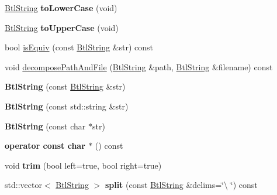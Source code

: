 \begin{DoxyCompactItemize}
\item 
\mbox{\label{class_btl_string_ada1b52b906ff481c13f55b7373386489}} 
\hyperlink{class_btl_string}{Btl\+String} {\bfseries to\+Lower\+Case} (void)
\item 
\mbox{\label{class_btl_string_a2f5dfde0fecaeaf2d2bb359c0cdb22cb}} 
\hyperlink{class_btl_string}{Btl\+String} {\bfseries to\+Upper\+Case} (void)
\item 
bool \hyperlink{class_btl_string_afdc2da5f185fa7585b1363b2dd6b36cb}{is\+Equiv} (const \hyperlink{class_btl_string}{Btl\+String} \&str) const
\item 
void \hyperlink{class_btl_string_a111377f6625fffeed8f02992fd164730}{decompose\+Path\+And\+File} (\hyperlink{class_btl_string}{Btl\+String} \&path, \hyperlink{class_btl_string}{Btl\+String} \&filename) const
\item 
\mbox{\label{class_btl_string_a21d40446a7d25f3ef740f80689f32f66}} 
{\bfseries Btl\+String} (const \hyperlink{class_btl_string}{Btl\+String} \&str)
\item 
\mbox{\label{class_btl_string_aab0e0973f37c21210515b58d1f973dbd}} 
{\bfseries Btl\+String} (const std\+::string \&str)
\item 
\mbox{\label{class_btl_string_aac66632b3613e854eb4437af8e893b41}} 
{\bfseries Btl\+String} (const char $\ast$str)
\item 
\mbox{\label{class_btl_string_ad53f1bbcd9a0af65b267869395e0ac82}} 
{\bfseries operator const char $\ast$} () const
\item 
\mbox{\label{class_btl_string_a6f98887f0f3fae14f3294eb393cf8bbe}} 
void {\bfseries trim} (bool left=true, bool right=true)
\item 
\mbox{\label{class_btl_string_a2d6f3640cbd692594b1320751b8d8f99}} 
std\+::vector$<$ \hyperlink{class_btl_string}{Btl\+String} $>$ {\bfseries split} (const \hyperlink{class_btl_string}{Btl\+String} \&delims=\char`\"{}\textbackslash{} \char`\"{}) const
\item 
\mbox{\label{class_btl_string_a5804fac083c250b889873dfc6e26413d}} 

\end{DoxyCompactItemize}
